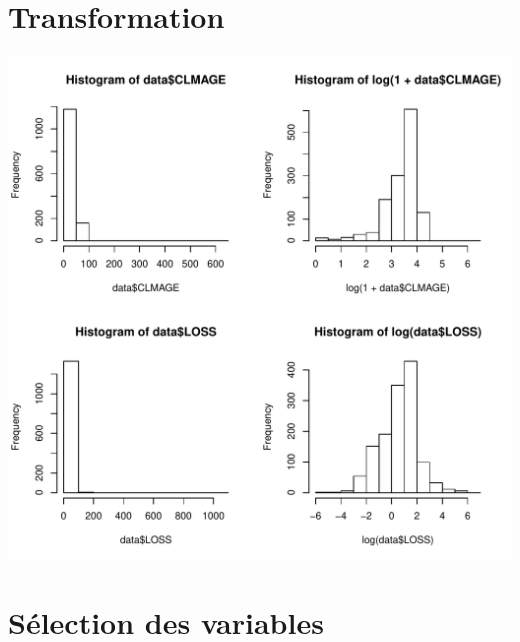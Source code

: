 \documentclass{article}\usepackage[]{graphicx}\usepackage[]{color}
\makeatletter
\def\maxwidth{ %
  \ifdim\Gin@nat@width>\linewidth
    \linewidth
  \else
    \Gin@nat@width
  \fi
}
\newenvironment{knitrout}{}{} %
\makeatother
\begin{document}
\begin{appendices}
\section{Transformation}
\label{annex:transfo}
\begin{knitrout}
\color{fgcolor}
\includegraphics[width=\maxwidth]{figure/unnamed-chunk-5-1} 

\end{knitrout}


\section{Sélection des variables}
\end{appendices}
\end{document}

